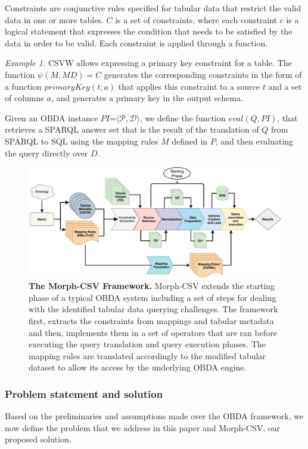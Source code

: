 Constraints are conjunctive rules specified for tabular data that restrict the valid data in one or more tables. $C$ is a set of constraints, where each constraint $c$ is a logical statement that expresses the condition that needs to be satisfied by the data in order to be valid. Each constraint is applied through a function.

\textit{Example 1.} CSVW allows expressing a primary key constraint for a table. The function $\psi(M,MD)=C$ generates the corresponding constraints in the form of a function $primaryKey(t,a)$ that applies this constraint to a source $t$ and a set of columns $a$, and generates a primary key in the output schema. 

Given an OBDA instance $PI$=$\langle\mathcal{P,D}\rangle$, we define the function $eval(Q,PI)$, that retrieves a SPARQL answer set that is the result of the translation of $Q$ from SPARQL to SQL using the mapping rules $M$ defined in $P$, and then evaluating the query directly over $D$. 


\begin{figure}[t]
    \centering
    \includegraphics[width=1\linewidth]{figures/workflow.pdf}
    \caption[Morph-CSV framework]{\textbf{The Morph-CSV Framework.} Morph-CSV extends the starting phase of a typical OBDA system including a set of steps for dealing with the identified tabular data querying challenges. The framework first, extracts the constraints from mappings and tabular metadata and then, implements them in a set of operators that are ran before executing the query translation and query execution phases. The mapping rules are translated accordingly to the modified tabular dataset to allow its access by the underlying OBDA engine.}
    \label{fig:workflow}
\end{figure}

\subsubsection{Problem statement and solution}
Based on the preliminaries and assumptions made over the OBDA framework, we now define the problem that we address in this paper and Morph-CSV, our proposed solution.

